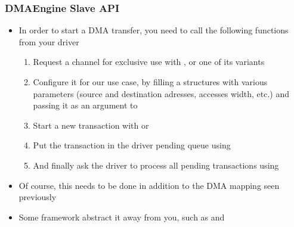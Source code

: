 \begin{frame}
  \frametitle{DMAEngine Slave API}
  \begin{itemize}
  \item In order to start a DMA transfer, you need to call the
    following functions from your driver
    \begin{enumerate}
    \item Request a channel for exclusive use with
      , or one of its variants
    \item Configure it for our use case, by filling a
       structures with various parameters
      (source and destination adresses, accesses width, etc.) and
      passing it as an argument to 
    \item Start a new transaction with
       or
    \item Put the transaction in the driver pending queue using
    \item And finally ask the driver to process all pending
      transactions using 
    \end{enumerate}
  \item Of course, this needs to be done in addition to the DMA
    mapping seen previously
  \item Some framework abstract it away from you, such as 
    and 
  \end{itemize}
\end{frame}
